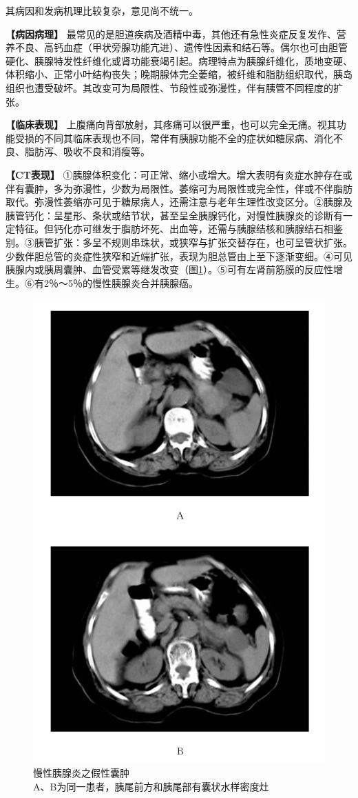 其病因和发病机理比较复杂，意见尚不统一。

\textbf{【病因病理】}
最常见的是胆道疾病及酒精中毒，其他还有急性炎症反复发作、营养不良、高钙血症（甲状旁腺功能亢进）、遗传性因素和结石等。偶尔也可由胆管硬化、胰腺特发性纤维化或肾功能衰竭引起。病理特点为胰腺纤维化，质地变硬、体积缩小、正常小叶结构丧失；晚期腺体完全萎缩，被纤维和脂肪组织取代，胰岛组织也遭受破坏。其改变可为局限性、节段性或弥漫性，伴有胰管不同程度的扩张。

\textbf{【临床表现】}
上腹痛向背部放射，其疼痛可以很严重，也可以完全无痛。视其功能受损的不同其临床表现也不同，常伴有胰腺功能不全的症状如糖尿病、消化不良、脂肪泻、吸收不良和消瘦等。

\textbf{【CT表现】}
①胰腺体积变化：可正常、缩小或增大。增大表明有炎症水肿存在或伴有囊肿，多为弥漫性，少数为局限性。萎缩可为局限性或完全性，伴或不伴脂肪取代。弥漫性萎缩亦可见于糖尿病人，还需注意与老年生理性改变区分。②胰腺及胰管钙化：呈星形、条状或结节状，甚至呈全胰腺钙化，对慢性胰腺炎的诊断有一定特征。但钙化亦可继发于脂肪坏死、出血等，还需与胰腺结核和胰腺结石相鉴别。③胰管扩张：多呈不规则串珠状，或狭窄与扩张交替存在，也可呈管状扩张。少数伴胆总管的炎症性狭窄和近端扩张，表现为胆总管由上至下逐渐变细。④可见胰腺内或胰周囊肿、血管受累等继发改变（图\ref{fig13-2}）。⑤可有左肾前筋膜的反应性增生。⑥有2％～5％的慢性胰腺炎合并胰腺癌。

\begin{figure}[!htbp]
 \centering
 \includegraphics[width=.7\textwidth,height=\textheight,keepaspectratio]{./images/Image00302.jpg}
 \captionsetup{justification=centering}
 \caption{慢性胰腺炎之假性囊肿\\{\small A、B为同一患者，胰尾前方和胰尾部有囊状水样密度灶}}
 \label{fig13-2}
  \end{figure} 

